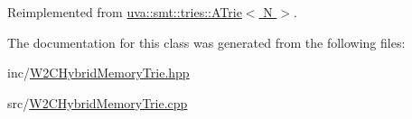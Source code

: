 Reimplemented from \hyperlink{classuva_1_1smt_1_1tries_1_1_a_trie_a4c523028bdf0949d762d1bbfd3fdc262}{uva\+::smt\+::tries\+::\+A\+Trie$<$ N $>$}.



The documentation for this class was generated from the following files\+:\begin{DoxyCompactItemize}
\item 
inc/\hyperlink{_w2_c_hybrid_memory_trie_8hpp}{W2\+C\+Hybrid\+Memory\+Trie.\+hpp}\item 
src/\hyperlink{_w2_c_hybrid_memory_trie_8cpp}{W2\+C\+Hybrid\+Memory\+Trie.\+cpp}\end{DoxyCompactItemize}
